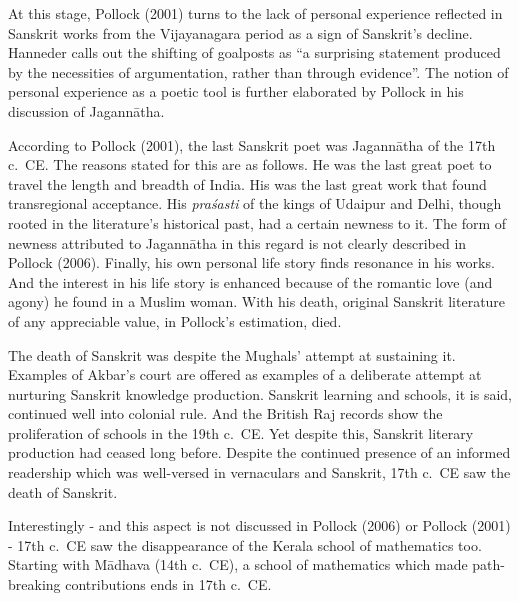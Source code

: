 At this stage, Pollock (2001) turns to the lack of personal experience reflected in Sanskrit works from the Vijayanagara period as a sign of Sanskrit’s decline. Hanneder calls out the shifting of goalposts as “a surprising statement produced by the necessities of argumentation, rather than through evidence”. The notion of personal experience as a poetic tool is further elaborated by Pollock in his discussion of Jagannātha. 
\vskip 1.5pt

According to Pollock (2001), the last Sanskrit poet was Jagannātha of the 17th c.\ CE\@. The reasons stated for this are as follows. He was the last great poet to travel the length and breadth of India. His was the last great work that found transregional acceptance. His {\sl praśasti} of the kings of Udaipur and Delhi, though rooted in the literature’s historical past, had a certain newness to it. The form of newness attributed to Jagannātha in this regard is not clearly described in Pollock (2006). Finally, his own personal life story finds resonance in his works. And the interest in his life story is enhanced because of the romantic love (and agony) he found in a Muslim woman. With his death, original Sanskrit literature of any appreciable value, in Pollock’s estimation, died.
\vskip 1.5pt

The death of Sanskrit was despite the Mughals’ attempt at sustaining it. Examples of Akbar’s court are offered as examples of a deliberate attempt at nurturing Sanskrit knowledge production. Sanskrit learning and schools, it is said, continued well into colonial rule. And the British Raj records show the proliferation of schools in the 19th c.\ CE\@. Yet despite this, Sanskrit literary production had ceased long before. Despite the continued presence of an informed readership which was well-versed in vernaculars and Sanskrit, 17th c.\ CE saw the death of Sanskrit.

Interestingly - and this aspect is not discussed in Pollock (2006) or Pollock (2001) - 17th c.\ CE saw the disappearance of the Kerala school of mathematics too. Starting with Mādhava (14th c.\ CE), a school of mathematics which made path-breaking contributions ends in 17th c.~CE.

